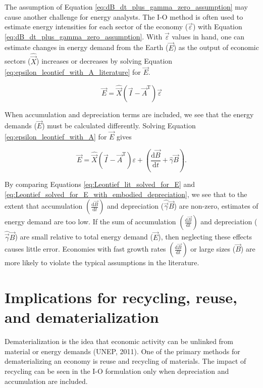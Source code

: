 The assumption of Equation \ref{eq:dB_dt_plus_gamma_zero_assumption} may cause another challenge for energy analysts. The I-O method is often used to estimate energy intensities for each sector of the economy ($\vec{\varepsilon}$) with Equation \ref{eq:dB_dt_plus_gamma_zero_assumption}. With $\vec{\varepsilon}$ values in hand, one can estimate changes in energy demand from the Earth ($\vec{E}$) as the output of economic sectors ($\hat{\vec{X}}$) increases or decreases by solving Equation \ref{eq:epsilon_leontief_with_A_literature} for $\vec{E}$.

\begin{equation} \label{eq:Leontief_lit_solved_for_E}
	\vec{E} = \hat{\vec{X}}(\vec{I} - \vec{A}^{\mathrm{T}})\vec{\varepsilon}
\end{equation}

When accumulation and depreciation terms are included, we see that the energy demands ($\vec{E}$) must be calculated differently. Solving Equation \ref{eq:epsilon_leontief_with_A} for $\vec{E}$ gives 

\begin{equation} \label{eq:Leontief_solved_for_E_with_embodied_depreciation}
	\vec{E} = \hat{\vec{X}}(\vec{I} - \vec{A}^{\mathrm{T}})\varepsilon + \left(\frac{\mathrm{d}\vec{B}}{\mathrm{d}t} + \hat{\gamma}\vec{B}\right).
\end{equation}

\noindent By comparing Equations \ref{eq:Leontief_lit_solved_for_E} and \ref{eq:Leontief_solved_for_E_with_embodied_depreciation}, we see that to the extent that accumulation $\left(\frac{\mathrm{d}\vec{B}}{\mathrm{d}t}\right)$ and depreciation ($\hat{\vec{\gamma}}\vec{B}$) are non-zero, estimates of energy demand are too low. If the sum of accumulation $\left(\frac{\mathrm{d}\vec{B}}{\mathrm{d}t}\right)$ and depreciation ($\hat{\vec{\gamma}}\vec{B}$) are small relative to total energy demand ($\vec{E}$), then neglecting these effects causes little error. Economies with fast growth rates $\left(\frac{\mathrm{d}\vec{B}}{\mathrm{d}t}\right)$ or large sizes ($\vec{B}$) are more likely to violate the typical assumptions in the literature.


\section{Implications for recycling, reuse, and dematerialization}

Dematerialization is the idea that economic activity can be unlinked from material or energy demands (UNEP, 2011). One of the primary methods for dematerializing an economy is reuse and recycling of materials. The impact of recycling can be seen in the I-O formulation only when depreciation and accumulation are included. 


